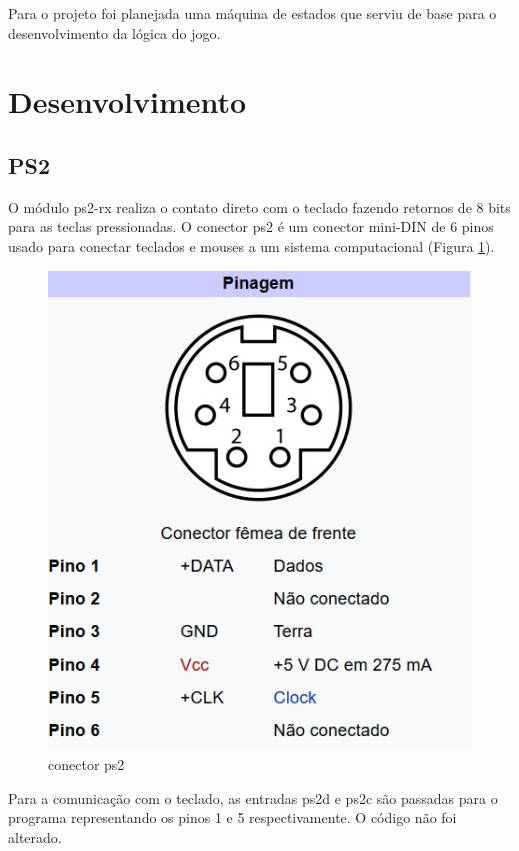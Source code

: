 \documentclass[a4paper,12pt,twoside]{article}
\begin{document}
    
Para o projeto foi planejada uma máquina de estados que serviu de base para o desenvolvimento da lógica do jogo.
\section{Desenvolvimento}

\subsection{PS2}
O módulo ps2-rx realiza o contato direto com o teclado fazendo retornos de 8 bits para as teclas pressionadas. O conector ps2 é um conector mini-DIN de 6 pinos usado para conectar teclados e mouses a um sistema computacional (Figura \ref{fig:ps2-conector}). 

\begin{figure}[H]
\centering
\includegraphics[scale=0.8]{ps2.jpg}
\caption{conector ps2}
\label{fig:ps2-conector}
\end{figure}

Para a comunicação com o teclado, as entradas ps2d e ps2c são passadas para o programa representando os pinos 1 e 5 respectivamente. O código não foi alterado.
\end{document}
